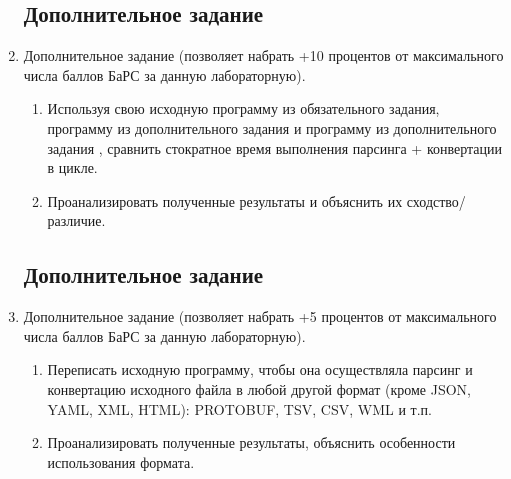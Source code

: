 \begin{enumerate}
            
            \lstset{language=Python}
            \lstset{language=XML}
            
            \subsection{Дополнительное задание }
      \item Дополнительное задание  (позволяет набрать +10
            процентов от максимального числа баллов БаРС за данную
            лабораторную).
            \begin{enumerate}
                  \item Используя свою исходную программу из обязательного
                        задания, программу из дополнительного задания  и
                        программу из дополнительного задания , сравнить
                        стократное время выполнения парсинга + конвертации в
                        цикле.
                  \item Проанализировать полученные результаты и объяснить их
                        сходство/различие.
            \end{enumerate}
            
            \lstset{language=Python}
            \lstset{language=Python}
            
            \subsection{Дополнительное задание }
      \item  Дополнительное задание  (позволяет набрать +5
            процентов от максимального числа баллов БаРС за данную
            лабораторную).
            \begin{enumerate}
                  \item  Переписать исходную программу, чтобы она осуществляла
                        парсинг и конвертацию исходного файла в любой другой
                        формат (кроме JSON, YAML, XML, HTML): PROTOBUF,
                        TSV, CSV, WML и т.п.
                  \item  Проанализировать полученные результаты, объяснить
                        особенности использования формата.
            \end{enumerate}
            

\end{enumerate}
